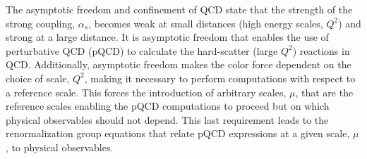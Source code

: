 The asymptotic freedom and confinement of QCD state that the strength of the strong coupling, $\alpha_s$, becomes weak at
small distances (high energy scales, $Q^2$) and strong at a large distance.
It is asymptotic freedom that enables the use of perturbative QCD (pQCD) to calculate the hard-scatter (large $Q^2$)
reactions in QCD. Additionally, asymptotic freedom makes the color force dependent on the choice of scale, $Q^2$,
making it necessary to perform computations with respect to a reference scale.
This forces the introduction of arbitrary scales, $\mu$, that are the reference scales enabling the pQCD computations
to proceed but on which physical observables should not depend.
This last requirement leads to the renormalization group equations that relate pQCD expressions at a given
scale, $\mu$, to physical observables.


